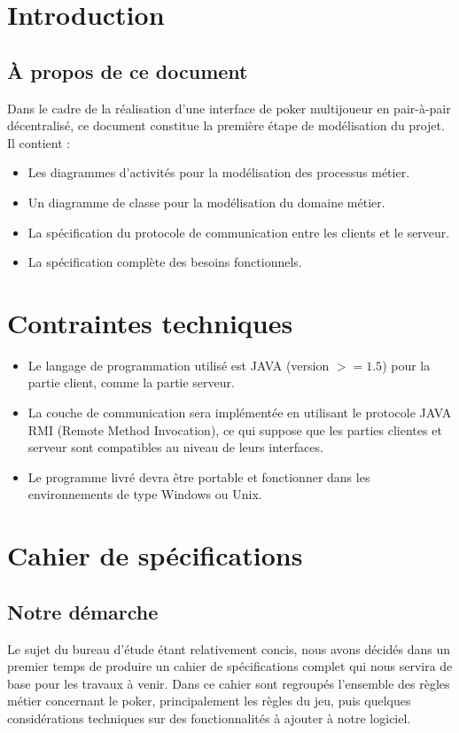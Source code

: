 
\section{Introduction}

\subsection{\`A propos de ce document}
Dans le cadre de la réalisation d'une interface de poker multijoueur en 
pair-à-pair décentralisé, ce document constitue la première étape de 
modélisation du projet. 
Il contient :
{\renewcommand\labelitemi{\textbullet}
\begin{itemize}
	\item Les diagrammes d'activités pour la modélisation des processus métier.
	\item Un diagramme de classe pour la modélisation du domaine métier.
	\item La spécification du protocole de communication entre les clients et le
	      serveur.
	\item La spécification complète des besoins fonctionnels. 
\end{itemize}}

\section{Contraintes techniques}

{\renewcommand\labelitemi{\textbullet}
\begin{itemize}
	\item Le langage de programmation utilisé est JAVA (version $>= 1.5$) pour 
	      la partie client, comme la partie serveur.
	\item La couche de communication sera implémentée en utilisant le protocole
		  JAVA RMI (Remote Method Invocation), ce qui suppose que les parties
		  clientes et serveur sont compatibles au niveau de leurs interfaces.
	\item Le programme livré devra être portable et fonctionner dans les
	      environnements de type Windows ou Unix.
\end{itemize}}

\section{Cahier de spécifications}

\subsection{Notre démarche}

Le sujet du bureau d'étude étant relativement concis, nous avons décidés dans un
premier temps de produire un cahier de spécifications complet qui nous servira
de base pour les travaux à venir.
Dans ce cahier sont regroupés l'ensemble des règles métier concernant le poker,
principalement les règles du jeu, puis quelques considérations techniques sur 
des fonctionnalités à ajouter à notre logiciel.

